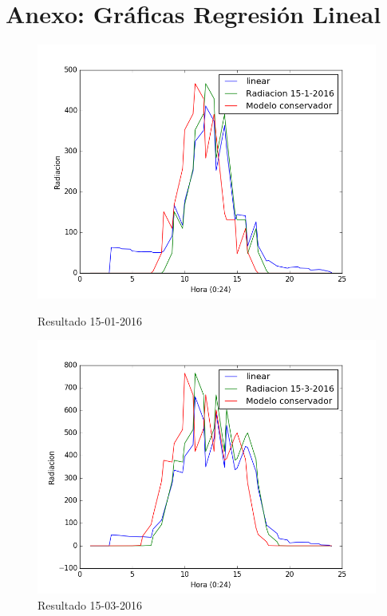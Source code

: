 
\cleardoublepage

\chapter{Anexo: Gráficas Regresión Lineal}
\label{Appendix:Key1}



\begin{figure}[htb]
		\includegraphics[width=\linewidth]{figures/linear_2016011520160115.png}
		\caption{Resultado 15-01-2016 \label{resultado_linear_1}}
\endminipage\hfill
{}
		\includegraphics[width=\linewidth]{figures/linear_2016031520160315.png}
		\caption{Resultado 15-03-2016 \label{resultado_linear_2}}
\endminipage\hfill
\end{figure}

